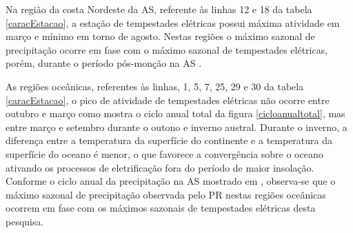 


Na região da costa Nordeste da AS, referente às linhas 12 e 18 da tabela \ref{caracEstacao}, a estação de tempestades elétricas possui máxima atividade em março e mínimo em torno de agosto. Nestas regiões o máximo sazonal de precipitação ocorre em fase com o máximo sazonal de tempestades elétricas, porém, durante o período pós-monção na AS \cite{grimm2003nino,reboita2010regimes,shi-atlas,bombardi2008variabilidade,cusdodioTese}.

As regiões oceânicas, referentes às linhas, 1, 5, 7, 25, 29 e 30 da tabela \ref{caracEstacao}, o pico de atividade de tempestades elétricas não ocorre entre outubro e março como mostra o ciclo anual total da figura \ref{cicloanualtotal}, mas entre março e setembro durante o outono e inverno austral.  Durante o inverno, a diferença entre a temperatura da superfície do continente e a temperatura da superfície do oceano é menor, o que favorece a convergência  sobre o oceano  ativando os processos de eletrificação fora do período de maior insolação. Conforme o ciclo anual da precipitação na AS mostrado em , observa-se que o máximo sazonal de precipitação observada pelo PR nestas regiões oceânicas ocorrem em fase com os máximos sazonais de tempestades elétricas desta pesquisa. 

